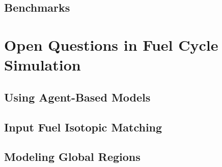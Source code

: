 \subsection{Benchmarks}

\section{Open Questions in Fuel Cycle Simulation}

\subsection{Using Agent-Based Models}

\subsection{Input Fuel Isotopic Matching}

\subsection{Modeling Global Regions}
